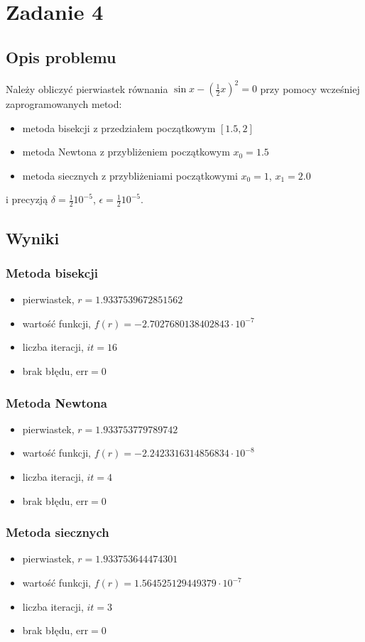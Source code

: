 \documentclass{article}
\begin{document}
\section*{Zadanie 4}
\subsection*{Opis problemu}
	Należy obliczyć pierwiastek równania $\sin x - \left(\frac{1}{2} x\right)^2 = 0$ przy pomocy wcześniej zaprogramowanych metod:
	\begin{itemize}
	    \item metoda bisekcji z przedziałem początkowym $[1.5, 2]$
	    \item metoda Newtona z przybliżeniem początkowym $x_0 = 1.5$
	    \item metoda siecznych z przybliżeniami początkowymi $x_0 = 1$, $x_1 = 2.0$
	\end{itemize}
\noindent i precyzją $\delta = \frac{1}{2} 10^{-5}$, $\epsilon = \frac{1}{2} 10^{-5}$.
\subsection*{Wyniki}
\subsubsection*{Metoda bisekcji}
		\begin{itemize}
			\item pierwiastek, $r = 1.9337539672851562$
		    \item wartość funkcji, $f(r) = -2.7027680138402843 \cdot 10^{-7}$
		    \item liczba iteracji, $it = 16$
		    \item brak błędu, $\mathrm{err} = 0$
		\end{itemize}
\subsubsection*{Metoda Newtona}
		\begin{itemize}
			\item pierwiastek, $r = 1.933753779789742$
		    \item wartość funkcji, $f(r) = -2.2423316314856834 \cdot 10^{-8}$
		    \item liczba iteracji, $it = 4$
		    \item brak błędu, $\mathrm{err} = 0$
		\end{itemize}
\subsubsection*{Metoda siecznych}
		\begin{itemize}
			\item pierwiastek, $r = 1.933753644474301$
		    \item wartość funkcji, $f(r) = 1.564525129449379 \cdot 10^{-7}$
		    \item liczba iteracji, $it = 3$
		    \item brak błędu, $\mathrm{err} = 0$
		\end{itemize}
\end{document}
